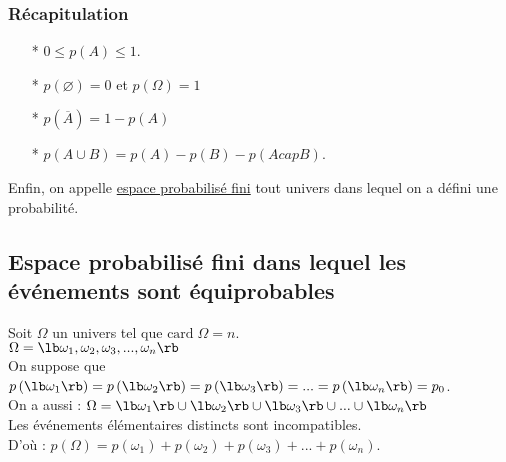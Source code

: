\subsubsection{Récapitulation}

\begin{itemize}
\item[*]$0 \leq p\left(A\right) \leq 1$. \\
\item[*] $p\left( \varnothing\right) = 0 $ et $ p\left(\Omega\right) = 1$ \\
\item[*] $p\left(\overline{A}\right) = 1 - p\left(A\right) $ \\
\item[*] $p\left( A \cup B \right) = p \left(A \right) - p \left(B \right) - p\left(A cap B\right) $. \\
\end{itemize}

\vspace*{.3cm}

Enfin, on appelle \underline{espace probabilisé fini} tout univers dans lequel on a défini une probabilité.

\newpage

\subsection{Espace probabilisé fini dans lequel les événements sont équiprobables}

 Soit $\Omega$ un univers tel que $\mathrm{card} \; \Omega = n$. \\
 
 $\Omega = \lb \omega_1 , \omega_2 , \omega_3, ... , \omega_n \rb $ \\
 
 On suppose que $p\left( \lb \omega_1 \rb \right) = p\left( \lb \omega_2 \rb \right) = p\left( \lb \omega_3 \rb \right) = ... = p\left( \lb \omega_n \rb \right) = p_0 $. \\
 
 On a aussi : $\Omega = \lb \omega_1 \rb \cup \lb \omega_2 \rb \cup \lb \omega_3 \rb \cup ... \cup \lb \omega_n \rb$ \\
 
 Les événements élémentaires distincts sont incompatibles. \\ D'où : $p\left(\Omega\right) = p\left(\omega_1\right) + p\left(\omega_2\right) + p\left(\omega_3\right) + ... + p\left(\omega_n\right)$. \\

